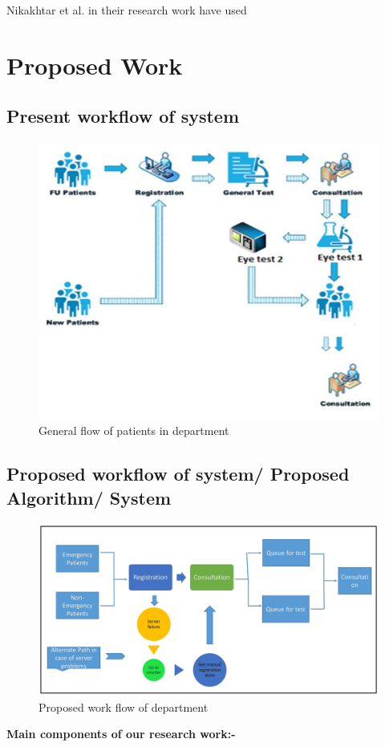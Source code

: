 \documentclass[12pt,a4paper]{report}
\begin{document}
Nikakhtar et al. \cite{nikakhtar2015social} in their research work have used

\chapter{Proposed Work}
\section{Present workflow of system}
\begin{figure}[h!]
	\begin{center}
		\includegraphics[scale=1]{flow.JPG}
		\caption{General flow of patients in department}
	\end{center}
\end{figure}

\pagebreak
\section{Proposed workflow of system/ Proposed Algorithm/ System}
\clearpage
\begin{figure}[h!]
	\begin{center}
		\includegraphics[scale=0.5]{final.jpg}
		\caption{Proposed work flow of department}
	\end{center}
\end{figure}
{\bf Main components of our research work:-}
\end{document}

